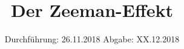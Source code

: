 

\subject{VERSUCH NUMMER 27}
\title{Der Zeeman-Effekt}
\date{
  Durchführung: 26.11.2018
  \hspace{3em}
  Abgabe: XX.12.2018
}



\thispagestyle{empty}
\maketitle
\thispagestyle{empty}
\tableofcontents
\newpage
\setcounter{page}{1}


% 




\nocite{*}
\printbibliography


